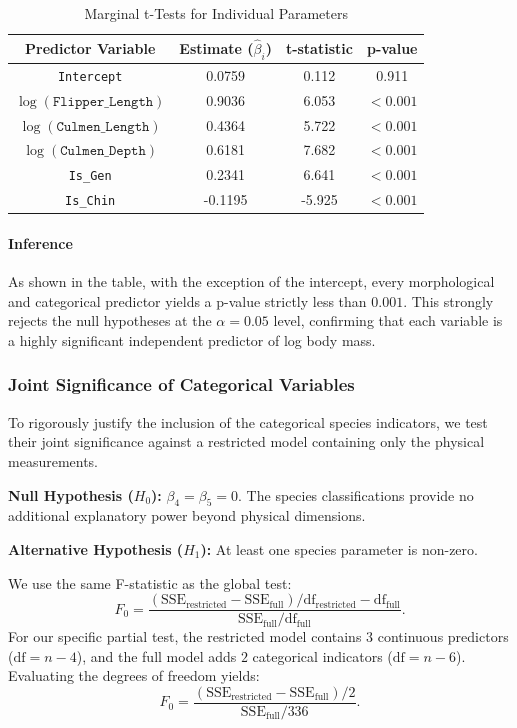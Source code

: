 \documentclass[12pt]{article}
\begin{document}
\begin{table}[H]
  \centering
  \begin{tabular}{|| c | c | c | c ||}
    \hline
    \textbf{Predictor Variable}
    & \textbf{Estimate ($\hat{\beta}_i$)}
    & \textbf{t-statistic}
    & \textbf{p-value} \\
    \hline\hline
    \texttt{Intercept} & 0.0759 & 0.112 & 0.911 \\
    $\log(\texttt{Flipper\_Length})$ & 0.9036 & 6.053 & $<0.001$ \\
    $\log(\texttt{Culmen\_Length})$ & 0.4364 & 5.722 & $<0.001$ \\
    $\log(\texttt{Culmen\_Depth})$ & 0.6181 & 7.682 & $<0.001$ \\
    \texttt{Is\_Gen} & 0.2341 & 6.641 & $<0.001$ \\
    \texttt{Is\_Chin} & -0.1195 & -5.925 & $<0.001$ \\
    \hline
  \end{tabular}
  \caption{Marginal t-Tests for Individual Parameters}
\end{table}

\paragraph{Inference}
As shown in the table, with the exception of the intercept,
every morphological and categorical predictor yields a
p-value strictly less than $0.001$. This strongly rejects
the null hypotheses at the $\alpha = 0.05$ level, confirming
that each variable is a highly significant independent
predictor of log body mass.

\subsubsection{Joint Significance of Categorical Variables}
To rigorously justify the inclusion of the categorical
species indicators, we test their joint significance against
a restricted model containing only the physical measurements.
\begin{itemize}
    \ii \textbf{Null Hypothesis ($H_0$):} $\beta_4 = \beta_5 = 0$.
    The species classifications provide no additional
    explanatory power beyond physical dimensions.

    \ii \textbf{Alternative Hypothesis ($H_1$):} At least one
    species parameter is non-zero.
\end{itemize}
We use the same F-statistic as the global test:
\[
  F_0 = \frac{{(\text{SSE}_{\text{restricted}} -
    \text{SSE}_{\text{full}})} / {\mathrm{df}_{\text{restricted}} -
  \mathrm{df}_{\text{full}}}}{\text{SSE}_{\text{full}}
  / \mathrm{df}_{\text{full}}}
.\]
For our specific partial test, the restricted model contains
$3$ continuous predictors ($\mathrm{df} = n-4$), and the full model
adds $2$ categorical indicators ($\mathrm{df} = n-6$). Evaluating
the degrees of freedom yields:
\[
  F_0 = \frac{(\text{SSE}_{\text{restricted}} -
  \text{SSE}_{\text{full}}) / 2}{\text{SSE}_{\text{full}}
  / 336}
.\]
\end{document}
